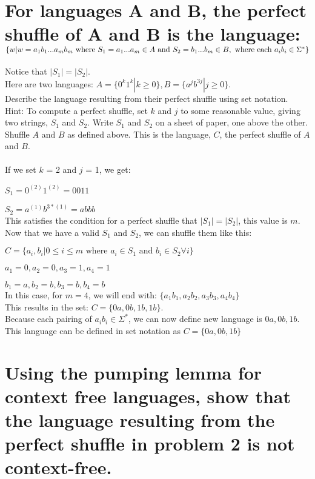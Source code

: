 \documentclass{article}
\begin{document}
\section{For languages A and B, the perfect shuffle of A and B is the language: \\
  $\{w | w = a_1 b_1 ... a_m b_m \text{ where } S_1 = a_1 ...  a_m \in A \\
    \text{ and } S_2 = b_1 ...  b_m \in B, \text{ where each } a_i b_i  \in \Sigma^*\}$}

Notice that $|S_1| = |S_2|$. \\
Here are two languages: $A = \{0^k 1^k | k \ge 0\},  B = \{a^j b^{3j} | j \ge 0\}$. \\
Describe the language resulting from their perfect shuffle using set notation. \\
Hint: To compute a perfect shuffle, set $k$ and $j$ to some reasonable value, giving two strings, $S_1$ and $S_2$.  Write  $S_1$ and $S_2$ on a sheet of paper, one above the other.   Shuffle $A$ and $B$ as defined above. This is the language, $C$, the perfect shuffle of $A$ and $B$.
\\
\\
If we set $k$ = 2 and $j$ = 1, we get:

$S_1 = 0^{(2)} 1^{(2)} = 0011$

$S_2 = a^{(1)} b^{3*(1)} = abbb$
\\
This satisfies the condition for a perfect shuffle that $|S_1| = |S_2|$, this value is $m$.
\\
Now that we have a valid $S_1$ and $S_2$, we can shuffle them like this:

$C=\{a_i, b_i | 0 \le i \le m \text{ where } a_i \in S_1 \text{ and } b_i \in S_2 \forall i\}$

$a_1 = 0, a_2 = 0, a_3 = 1, a_4 = 1$

$b_1 = a, b_2 = b, b_3 = b, b_4 = b$
\\
In this case, for $m = 4$, we will end with: $\{a_1 b_1, a_2 b_2, a_3 b_3, a_4 b_4\}$
\\
This results in the set: $C = \{0 a, 0 b, 1 b, 1 b\}$.
\\
Because each pairing of $a_i b_i \in \Sigma^*$, we can now define new language is ${0a, 0b, 1b}$.
\\
This language can be defined in set notation as $C = \{0a, 0b, 1b\}$

\section{Using the pumping lemma for context free languages, show that the language resulting from the perfect shuffle in problem 2 is not context-free.}
\end{document}
